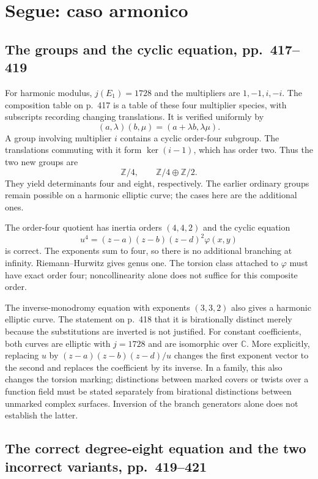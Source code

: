 \section{Segue: caso armonico}
\label{cp2-x-17}

\subsection{The groups and the cyclic equation, pp.~417--419}

For harmonic modulus, $j(E_1)=1728$ and the multipliers are $1,-1,i,-i$. The composition table on p.~417 is a table of these four multiplier species, with subscripts recording changing translations. It is verified uniformly by
\[
 (a,\lambda)(b,\mu)=(a+\lambda b,\lambda\mu).
\]
A group involving multiplier $i$ contains a cyclic order-four subgroup. The translations commuting with it form $\ker(i-1)$, which has order two. Thus the two new groups are
\[
 \mathbb Z/4,\qquad\mathbb Z/4\oplus\mathbb Z/2.
\]
They yield determinants four and eight, respectively. The earlier ordinary groups remain possible on a harmonic elliptic curve; the cases here are the additional ones.

The order-four quotient has inertia orders $(4,4,2)$ and the cyclic equation
\[
 u^4=(z-a)(z-b)(z-d)^2\varphi(x,y)
\]
is correct. The exponents sum to four, so there is no additional branching at infinity. Riemann--Hurwitz gives genus one. The torsion class attached to $\varphi$ must have exact order four; noncollinearity alone does not suffice for this composite order.

The inverse-monodromy equation with exponents $(3,3,2)$ also gives a harmonic elliptic curve. The statement on p.~418 that it is birationally distinct merely because the substitutions are inverted is not justified. For constant coefficients, both curves are elliptic with $j=1728$ and are isomorphic over $\mathbb C$. More explicitly, replacing $u$ by $(z-a)(z-b)(z-d)/u$ changes the first exponent vector to the second and replaces the coefficient by its inverse. In a family, this also changes the torsion marking; distinctions between marked covers or twists over a function field must be stated separately from birational distinctions between unmarked complex surfaces. Inversion of the branch generators alone does not establish the latter.

\subsection{The correct degree-eight equation and the two incorrect variants, pp.~419--421}

